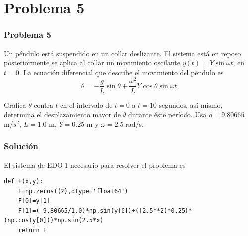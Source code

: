 \section{Problema 5}
\begin{frame}
\frametitle{Problema 5}
Un péndulo está suspendido en un collar deslizante. El sistema está en reposo, posteriormente se aplica al collar un movimiento oscilante $y(t) = Y \sin \omega t$, en $t=0$. La ecuación diferencial que describe el movimiento del péndulo es
\[ \ddot{\theta} = - \dfrac{g}{L} \sin \theta + \dfrac{\omega^{2}}{L} Y \cos \theta \sin \omega t\]
\begin{center}
\end{center}
\end{frame}
\begin{frame}
Grafica $\theta$ contra $t$ en el intervalo de $t=0$ a $t=10$ segundos, así mismo, determina el desplazamiento mayor de $\theta$ durante éste período. Usa $g=9.80665$ m/$s^{2}$, $L=1.0$ m, $Y=0.25$ m y $\omega = 2.5$ rad/s.
\end{frame}
\begin{frame}[fragile]
\frametitle{Solución}
El sistema de EDO-1 necesario para resolver el problema es:
\begin{lstlisting}
def F(x,y):
    F=np.zeros((2),dtype='float64')
    F[0]=y[1]
    F[1]=(-9.80665/1.0)*np.sin(y[0])+((2.5**2)*0.25)*(np.cos(y[0]))*np.sin(2.5*x)
    return F
\end{lstlisting}
\end{frame}
